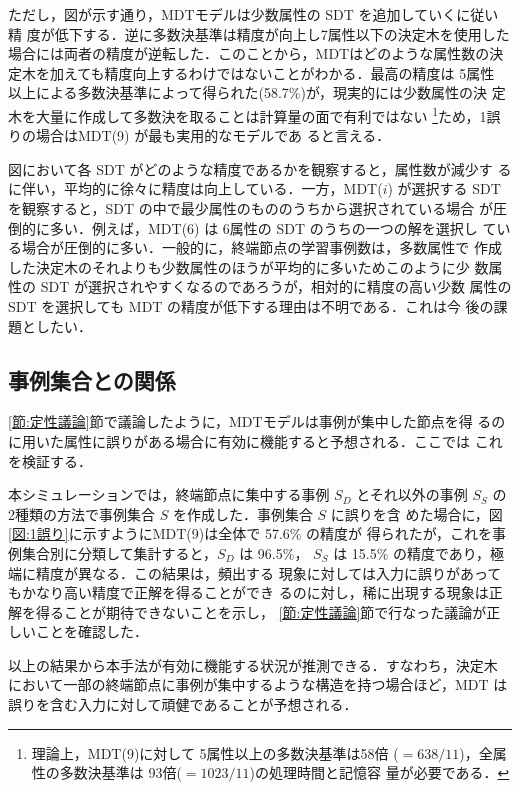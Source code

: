 ただし，図が示す通り，MDTモデルは少数属性の SDT を追加していくに従い精
度が低下する．逆に多数決基準は精度が向上し7属性以下の決定木を使用した
場合には両者の精度が逆転した．このことから，MDTはどのような属性数の決
定木を加えても精度向上するわけではないことがわかる．最高の精度は 5属性
以上による多数決基準によって得られた(58.7\%)が，現実的には少数属性の決
定木を大量に作成して多数決を取ることは計算量の面で有利ではない
\footnote{理論上，MDT(9)に対して 5属性以上の多数決基準は58倍
  ($=638/11$)，全属性の多数決基準は 93倍($=1023/11$)の処理時間と記憶容
  量が必要である．}ため，1誤りの場合はMDT(9) が最も実用的なモデルであ
ると言える．

図において各 SDT がどのような精度であるかを観察すると，属性数が減少す
るに伴い，平均的に徐々に精度は向上している．一方，MDT($i$) が選択する 
SDT を観察すると，SDT の中で最少属性のもののうちから選択されている場合
が圧倒的に多い．例えば，MDT(6) は 6属性の SDT のうちの一つの解を選択し
ている場合が圧倒的に多い．一般的に，終端節点の学習事例数は，多数属性で
作成した決定木のそれよりも少数属性のほうが平均的に多いためこのように少
数属性の SDT が選択されやすくなるのであろうが，相対的に精度の高い少数
属性の SDT を選択しても MDT の精度が低下する理由は不明である．これは今
後の課題としたい．


\subsection{事例集合との関係}
\label{節:定量議論}

\ref{節:定性議論}節で議論したように，MDTモデルは事例が集中した節点を得
るのに用いた属性に誤りがある場合に有効に機能すると予想される．ここでは
これを検証する．

本シミュレーションでは，終端節点に集中する事例 $S_D$ とそれ以外の事例 
$S_S$ の2種類の方法で事例集合 $S$ を作成した．事例集合 $S$ に誤りを含
めた場合に，図\ref{図:1誤り}に示すようにMDT(9)は全体で 57.6\% の精度が
得られたが，これを事例集合別に分類して集計すると，$S_D$ は 96.5\%，
$S_S$ は 15.5\% の精度であり，極端に精度が異なる．この結果は，頻出する
現象に対しては入力に誤りがあってもかなり高い精度で正解を得ることができ
るのに対し，稀に出現する現象は正解を得ることが期待できないことを示し，
\ref{節:定性議論}節で行なった議論が正しいことを確認した．

以上の結果から本手法が有効に機能する状況が推測できる．すなわち，決定木
において一部の終端節点に事例が集中するような構造を持つ場合ほど，MDT は
誤りを含む入力に対して頑健であることが予想される．



